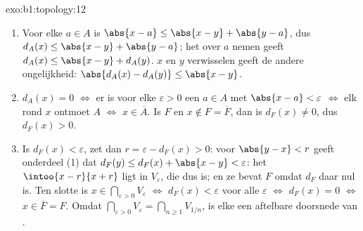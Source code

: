 \begin{solution}{exo:b1:topology:12}
\begin{enumerate}
  \item Voor elke $a \in A$ is $\abs{x - a} \leq \abs{x - y} + \abs{y -
        a}$, dus $d_A(x) \leq \abs{x - y} + \abs{y - a}$; het 
        over $a$ nemen geeft $d_A(x) \leq \abs{x - y} + d_A(y)$. $x$ en
        $y$ verwisselen geeft de andere ongelijkheid: $\abs{d_A(x) -
        d_A(y)} \leq \abs{x - y}$.
  \item $d_A(x) = 0$ $\iff$ er is voor elke $\varepsilon > 0$ een $a \in
        A$ met $\abs{x - a} < \varepsilon$ $\iff$ elk  rond $x$
        ontmoet $A$ $\iff$ $x \in \overline A$. Is $F$  en $x
        \notin F = \overline F$, dan is $d_F(x) \neq 0$, dus $d_F(x) >
        0$.
  \item Is $d_F(x) < \varepsilon$, zet dan $r = \varepsilon - d_F(x) >
        0$: voor $\abs{y - x} < r$ geeft onderdeel (1) dat $d_F(y) \leq
        d_F(x) + \abs{x - y} < \varepsilon$: het  $\intoo{x -
        r}{x + r}$ ligt in $V_\varepsilon$, die dus  is; en ze bevat
        $F$ omdat $d_F$ daar nul is. Ten slotte is $x \in
        \bigcap_{\varepsilon>0} V_\varepsilon$ $\iff$ $d_F(x) <
        \varepsilon$ voor alle $\varepsilon$ $\iff$ $d_F(x) = 0$ $\iff$
        $x \in \overline F = F$. Omdat $\bigcap_{\varepsilon > 0}
        V_\varepsilon = \bigcap_{n \geq 1} V_{1/n}$, is elke  een aftelbare doorsnede van .
\end{enumerate}
\end{solution}

